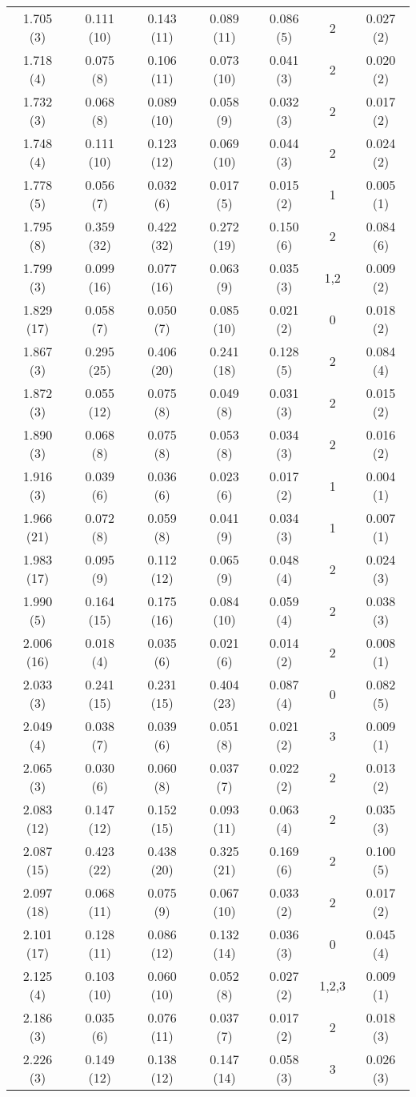 \begin{table}
\begin{tabular}{c c c c c c c}
1.705 (3) & 0.111 (10) & 0.143 (11) & 0.089 (11) & 0.086 (5) & 2 & 0.027 (2) \\
1.718 (4) & 0.075 (8) & 0.106 (11) & 0.073 (10) & 0.041 (3) & 2 & 0.020 (2) \\
1.732 (3) & 0.068 (8) & 0.089 (10) & 0.058 (9) & 0.032 (3) & 2 & 0.017 (2) \\
1.748 (4) & 0.111 (10) & 0.123 (12) & 0.069 (10) & 0.044 (3) & 2 & 0.024 (2) \\
1.778 (5) & 0.056 (7) & 0.032 (6) & 0.017 (5) & 0.015 (2) & 1 & 0.005 (1) \\
1.795 (8) & 0.359 (32) & 0.422 (32) & 0.272 (19) & 0.150 (6) & 2 & 0.084 (6) \\
1.799 (3) & 0.099 (16) & 0.077 (16) & 0.063 (9) & 0.035 (3) & 1,2 & 0.009 (2) \\
1.829 (17) & 0.058 (7) & 0.050 (7) & 0.085 (10) & 0.021 (2) & 0 & 0.018 (2) \\
1.867 (3) & 0.295 (25) & 0.406 (20) & 0.241 (18) & 0.128 (5) & 2 & 0.084 (4) \\
1.872 (3) & 0.055 (12) & 0.075 (8) & 0.049 (8) & 0.031 (3) & 2 & 0.015 (2) \\
1.890 (3) & 0.068 (8) & 0.075 (8) & 0.053 (8) & 0.034 (3) & 2 & 0.016 (2) \\
1.916 (3) & 0.039 (6) & 0.036 (6) & 0.023 (6) & 0.017 (2) & 1 & 0.004 (1) \\
1.966 (21) & 0.072 (8) & 0.059 (8) & 0.041 (9) & 0.034 (3) & 1 & 0.007 (1) \\
1.983 (17) & 0.095 (9) & 0.112 (12) & 0.065 (9) & 0.048 (4) & 2 & 0.024 (3) \\
1.990 (5) & 0.164 (15) & 0.175 (16) & 0.084 (10) & 0.059 (4) & 2 & 0.038 (3) \\
2.006 (16) & 0.018 (4) & 0.035 (6) & 0.021 (6) & 0.014 (2) & 2 & 0.008 (1) \\
2.033 (3) & 0.241 (15) & 0.231 (15) & 0.404 (23) & 0.087 (4) & 0 & 0.082 (5) \\
2.049 (4) & 0.038 (7) & 0.039 (6) & 0.051 (8) & 0.021 (2) & 3 & 0.009 (1) \\
2.065 (3) & 0.030 (6) & 0.060 (8) & 0.037 (7) & 0.022 (2) & 2 & 0.013 (2) \\
2.083 (12) & 0.147 (12) & 0.152 (15) & 0.093 (11) & 0.063 (4) & 2 & 0.035 (3) \\
2.087 (15) & 0.423 (22) & 0.438 (20) & 0.325 (21) & 0.169 (6) & 2 & 0.100 (5) \\
2.097 (18) & 0.068 (11) & 0.075 (9) & 0.067 (10) & 0.033 (2) & 2 & 0.017 (2) \\
2.101 (17) & 0.128 (11) & 0.086 (12) & 0.132 (14) & 0.036 (3) & 0 & 0.045 (4) \\
2.125 (4) & 0.103 (10) & 0.060 (10) & 0.052 (8) & 0.027 (2) & 1,2,3 & 0.009 (1) \\
2.186 (3) & 0.035 (6) & 0.076 (11) & 0.037 (7) & 0.017 (2) & 2 & 0.018 (3) \\
2.226 (3) & 0.149 (12) & 0.138 (12) & 0.147 (14) & 0.058 (3) & 3 & 0.026 (3) \\
\hline \hline
\end{tabular}
\label{Nd2}
\end{table}

